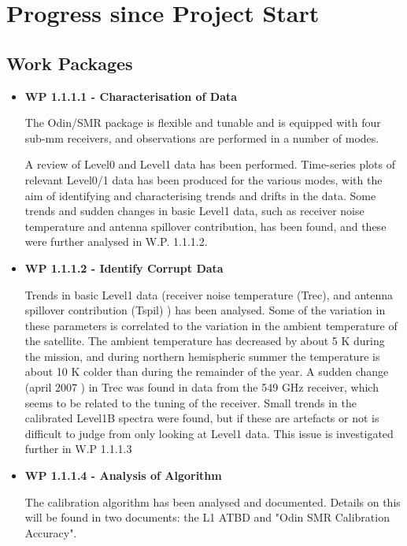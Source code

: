 \chapter{Progress since Project Start}
\label{chapter:progress}


\section{Work Packages}

\begin{itemize}

\item{\bf WP 1.1.1.1 - Characterisation of Data}

The Odin/SMR package is flexible and tunable and is equipped 
with four sub-mm receivers, and observations are performed
in a number of modes.

A review of Level0 and Level1 data has been performed.
Time-series plots of relevant Level0/1 data has been produced
for the various modes, with the aim of identifying and characterising 
trends and drifts in the data.
Some trends and sudden changes in basic Level1 data,
such as receiver noise temperature and antenna spillover 
contribution, has been found, and these were further analysed in W.P. 1.1.1.2.

\item{\bf WP 1.1.1.2 - Identify Corrupt Data}

Trends in basic Level1 data (receiver noise temperature (Trec),
and antenna spillover contribution (Tspil) ) has been analysed.
Some of the variation in these parameters is correlated to the
variation in the ambient temperature of the satellite.
The ambient temperature has decreased by about
5 K during the mission, and during northern hemispheric summer
the temperature is about 10 K colder than during the remainder of the year. 
A sudden change (april 2007 ) in Trec was found in data from
the 549 GHz receiver, which seems to be related to the tuning
of the receiver.
Small trends in the calibrated Level1B spectra were found,
but if these are artefacts or not is difficult 
to judge from only looking at Level1 data. 
This issue is investigated further in W.P 1.1.1.3 

\item{\bf WP 1.1.1.4 - Analysis of Algorithm }

The calibration algorithm has been analysed and documented. Details on this will be found in two documents: the L1 ATBD and "Odin SMR Calibration Accuracy".


\end{itemize}
